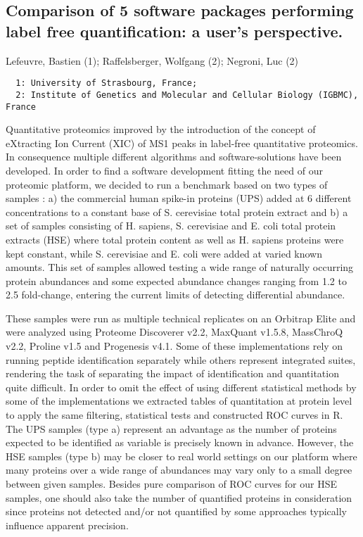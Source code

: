 {\subsection*{\color{eubicRed} Comparison of 5 software packages performing label free quantification: a user’s perspective.}
{\color{eubicGray}Lefeuvre, Bastien (1);
Raffelsberger, Wolfgang (2);
Negroni, Luc (2)}
{\color{eubicGray}\begin{verbatim}
  1: University of Strasbourg, France;
  2: Institute of Genetics and Molecular and Cellular Biology (IGBMC), France
\end{verbatim}}

Quantitative proteomics improved by the introduction of the concept of eXtracting Ion Current (XIC) of MS1 peaks in label-free quantitative proteomics. In consequence multiple different algorithms and software-solutions have been developed. In order to find a software development fitting the need of our proteomic platform, we decided to run a benchmark based on two types of samples : a) the commercial human spike-in proteins (UPS) added at 6 different concentrations to a constant base of S. cerevisiae total protein extract and b) a set of samples consisting of H. sapiens, S. cerevisiae and E. coli total protein extracts (HSE) where total protein content as well as H. sapiens proteins were kept constant, while S. cerevisiae and E. coli were added at varied known amounts. This set of samples allowed testing a wide range of naturally occurring protein abundances and some expected abundance changes ranging from 1.2 to 2.5 fold-change, entering the current limits of detecting differential abundance.

These samples were run as multiple technical replicates on an Orbitrap Elite and were analyzed using Proteome Discoverer v2.2, MaxQuant v1.5.8, MassChroQ v2.2, Proline v1.5 and Progenesis v4.1. Some of these implementations rely on running peptide identification separately while others represent integrated suites, rendering the task of separating the impact of identification and quantitation quite difficult. In order to omit the effect of using different statistical methods by some of the implementations we extracted tables of quantitation at protein level to apply the same filtering, statistical tests and constructed ROC curves in R. The UPS samples (type a) represent an advantage as the number of proteins expected to be identified as variable is precisely known in advance. However, the HSE samples (type b) may be closer to real world settings on our platform where many proteins over a wide range of abundances may vary only to a small degree between given samples. Besides pure comparison of ROC curves for our HSE samples, one should also take the number of quantified proteins in consideration since proteins not detected and/or not quantified by some approaches typically influence apparent precision.


}
